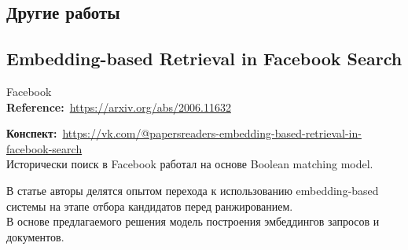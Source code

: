 \begin{bibunit}[plainnat]










\chapter{Другие работы}

\section*{Embedding-based Retrieval in Facebook Search}

Facebook \\

\textbf{Reference:}~\url{https://arxiv.org/abs/2006.11632}

\textbf{Конспект:}~\url{https://vk.com/@papersreaders-embedding-based-retrieval-in-facebook-search} \\

Исторически поиск в Facebook работал на основе Boolean matching model.

В статье авторы делятся опытом перехода к использованию embedding-based системы на этапе отбора кандидатов перед ранжированием. \\

В основе предлагаемого решения модель построения эмбеддингов запросов и документов. \\


\end{bibunit}
